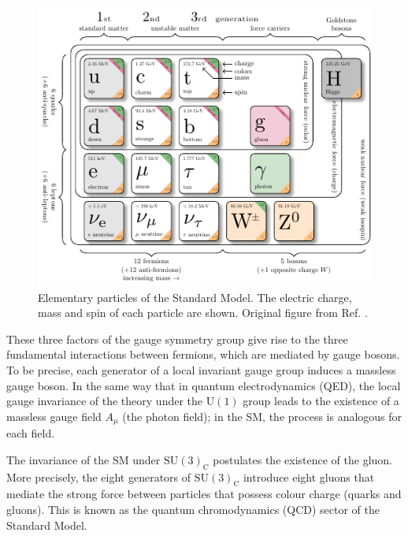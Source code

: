 \begin{figure}[!ht]
    \vspace*{-0.0cm}
    \centering
    \setlength{\mylength}{\textwidth}
    \includegraphics[width=0.98\mylength]{resources/SM_particles/SM_particles.pdf}
    \vspace*{-0.1cm}
    \caption{Elementary particles of the Standard Model. The electric charge, mass and spin of each particle are shown. Original figure from Ref. \cite{Wongel:2816526}.}
    \label{fig:SM}
    \vspace*{-0.0cm}
\end{figure}
These three factors of the gauge symmetry group give rise to the three fundamental interactions between fermions, which are mediated by gauge bosons. To be precise, each generator of a local invariant gauge group induces a massless gauge boson. In the same way that in quantum electrodynamics (QED), the local gauge invariance of the theory under the $\text{U}(1)$ group leads to the existence of a massless gauge field $A_\mu$ (the photon field); in the SM, the process is analogous for each field.

The invariance of the SM under $\text{SU}(3)_{\text{C}}$ postulates the existence of the gluon. More precisely, the eight generators of $\text{SU}(3)_{\text{C}}$ introduce eight gluons that mediate the strong force between particles that possess colour charge (quarks and gluons). This is known as the quantum chromodynamics (QCD) sector of the Standard Model.

